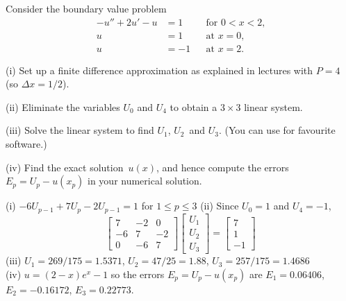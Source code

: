 \begin{Exercises}
\exercise
Consider the boundary value problem
\[
\begin{aligned}
-u''+2u'-u&=1&&\text{for $0<x<2$,}\\
u&=1&&\text{at $x=0$,}\\
u&=-1&&\text{at $x=2$.}
\end{aligned}
\]
\begin{description}
\item{(i)}
Set up a finite difference approximation as explained in lectures
with $P=4$ (so $\Delta x=1/2$).
\item{(ii)}
Eliminate the variables $U_0$ and $U_4$ to obtain a $3\times3$ linear
system.
\item{(iii)}
Solve the linear system to find $U_1$, $U_2$~and $U_3$.  (You can use
for favourite software.)
\item{(iv)}
Find the exact solution~$u(x)$, and hence compute the errors~$E_p=U_p-u(x_p)$ 
in your numerical solution.
\end{description}
\begin{ans}
(i) $-6U_{p-1}+7U_p-2U_{p-1}=1$ for $1\le p\le3$\quad
(ii) Since $U_0=1$ and $U_4=-1$,
\[
\begin{bmatrix}7&-2& 0\\ -6& 7&-2\\  0&-6& 7\end{bmatrix}
\begin{bmatrix}U_1\\ U_2\\ U_3\end{bmatrix}
=\begin{bmatrix}7\\ 1\\ -1\end{bmatrix}
\]
(iii) $U_1=269/175=1.5371$, $U_2=47/25=1.88$,
$U_3=257/175=1.4686$\\
(iv) $u=(2-x)e^x-1$ so the errors $E_p=U_p-u(x_p)$ are
$E_1=0.06406$, $E_2=-0.16172$, $E_3=0.22773$.
\end{ans}


\end{Exercises}
